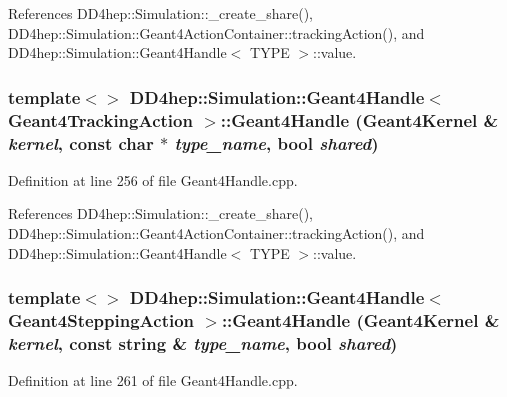 References DD4hep::Simulation::\_\-create\_\-share(), DD4hep::Simulation::Geant4ActionContainer::trackingAction(), and DD4hep::Simulation::Geant4Handle$<$ TYPE $>$::value.\hypertarget{class_d_d4hep_1_1_simulation_1_1_geant4_handle_aa6e659182a031473d945668f9fac0659}{
\subsubsection[{Geant4Handle}]{\setlength{\rightskip}{0pt plus 5cm}template$<$$>$ {\bf DD4hep::Simulation::Geant4Handle}$<$ {\bf Geant4TrackingAction} $>$::{\bf Geant4Handle} ({\bf Geant4Kernel} \& {\em kernel}, \/  const char $\ast$ {\em type\_\-name}, \/  bool {\em shared})}}
\label{class_d_d4hep_1_1_simulation_1_1_geant4_handle_aa6e659182a031473d945668f9fac0659}


Definition at line 256 of file Geant4Handle.cpp.

References DD4hep::Simulation::\_\-create\_\-share(), DD4hep::Simulation::Geant4ActionContainer::trackingAction(), and DD4hep::Simulation::Geant4Handle$<$ TYPE $>$::value.\hypertarget{class_d_d4hep_1_1_simulation_1_1_geant4_handle_a6a36ee9cdcf7791b090f056f08f0075e}{
\subsubsection[{Geant4Handle}]{\setlength{\rightskip}{0pt plus 5cm}template$<$$>$ {\bf DD4hep::Simulation::Geant4Handle}$<$ {\bf Geant4SteppingAction} $>$::{\bf Geant4Handle} ({\bf Geant4Kernel} \& {\em kernel}, \/  const {\bf string} \& {\em type\_\-name}, \/  bool {\em shared})}}
\label{class_d_d4hep_1_1_simulation_1_1_geant4_handle_a6a36ee9cdcf7791b090f056f08f0075e}


Definition at line 261 of file Geant4Handle.cpp.


